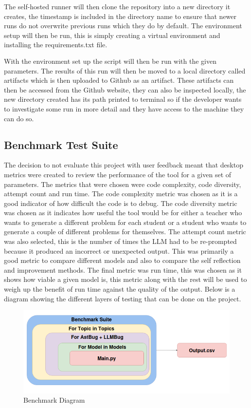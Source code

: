 \documentclass[12pt]{extarticle}
\begin{document}
The self-hosted runner will then clone the repository into a new directory it creates, the timestamp is included in the directory name to ensure that newer runs do not overwrite previous runs which they do by default. The environment setup will then be run, this is simply creating a virtual environment and installing the requirements.txt file.

With the environment set up the script will then be run with the given parameters. The results of this run will then be moved to a local directory called artifacts which is then uploaded to Github as an artifact. These artifacts can then be accessed from the Github website, they can also be inspected locally, the new directory created has its path printed to terminal so if the developer wants to investigate some run in more detail and they have access to the machine they can do so.

\subsection{Benchmark Test Suite}

The decision to not evaluate this project with user feedback meant that desktop metrics were created to review the performance of the tool for a given set of parameters. The metrics that were chosen were code complexity, code diversity, attempt count and run time. The code complexity metric was chosen as it is a good indicator of how difficult the code is to debug. The code diversity metric was chosen as it indicates how useful the tool would be for either a teacher who wants to generate a different problem for each student or a student who wants to generate a couple of different problems for themselves. The attempt count metric was also selected, this is the number of times the LLM had to be re-prompted because it produced an incorrect or unexpected output. This was primarily a good metric to compare different models and also to compare the self reflection and improvement methods. The final metric was run time, this was chosen as it shows how viable a given model is, this metric along with the rest will be used to weigh up the benefit of run time against the quality of the output. Below is a diagram showing the different layers of testing that can be done on the project.

\begin{figure}[H]
\centering
\includegraphics[width=0.7\linewidth]{Images/Benchmark.png}
\caption{Benchmark Diagram}
\label{fig:benchmark_results}
\end{figure}
\end{document}
